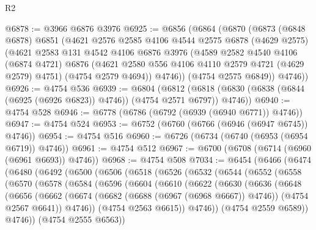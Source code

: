 \begin{lexlean}{R2}
\begin{coremodule}
@6878 := @3966 @6876 @3976
@6925 := @6856
    (@6864
      (@6870
        (@6873
          (@6848 @6878)
          @6851
          (@4621
            @2576
            @2585
            @4106
            @4544
            @2575
            @6878
            (@4629 @2575)
            (@4621
              @2583
              @131
              @4542
              @4106
              @6876
              @3976
              (@4589
                @2582
                @4540
                @4106
                (@6874 @4721)
                @6876
                (@4621 @2580 @556 @4106 @4110 @2579 @4721 (@4629 @2579) @4751)
                (@4754 @2579 @4694))
              @4746))
          (@4754 @2575 @6849))
        @4746))
@6926 := @4754 @536
@6939 := @6804
    (@6812 (@6818 (@6830 (@6838 (@6844 (@6925 (@6926 @6823)) @4746)) (@4754 @2571 @6797)) @4746))
@6940 := @4754 @528
@6946 := @6778 (@6786 (@6792 (@6939 (@6940 @6771)) @4746))
@6947 := @4754 @524
@6953 := @6752 (@6760 (@6766 (@6946 (@6947 @6745)) @4746))
@6954 := @4754 @516
@6960 := @6726 (@6734 (@6740 (@6953 (@6954 @6719)) @4746))
@6961 := @4754 @512
@6967 := @6700 (@6708 (@6714 (@6960 (@6961 @6693)) @4746))
@6968 := @4754 @508
@7034 := @6454
    (@6466
      (@6474
        (@6480
          (@6492
            (@6500
              (@6506
                (@6518
                  (@6526
                    (@6532
                      (@6544
                        (@6552
                          (@6558
                            (@6570
                              (@6578
                                (@6584
                                  (@6596
                                    (@6604
                                      (@6610
                                        (@6622
                                          (@6630
                                            (@6636
                                              (@6648
                                                (@6656
                                                  (@6662
                                                    (@6674
                                                      (@6682 (@6688 (@6967 (@6968 @6667)) @4746))
                                                      (@4754 @2567 @6641))
                                                    @4746))
                                                (@4754 @2563 @6615))
                                              @4746))
                                          (@4754 @2559 @6589))
                                        @4746))
                                    (@4754 @2555 @6563))

\end{coremodule}
\end{lexlean}
